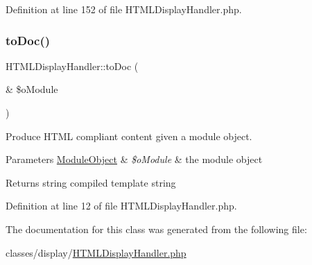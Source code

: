 Definition at line 152 of file H\+T\+M\+L\+Display\+Handler.\+php.

\hypertarget{classHTMLDisplayHandler_a01d7fabb31ab447663f866efa36118a3}{}\label{classHTMLDisplayHandler_a01d7fabb31ab447663f866efa36118a3} 
\subsubsection{\texorpdfstring{to\+Doc()}{toDoc()}}
{\footnotesize\ttfamily H\+T\+M\+L\+Display\+Handler\+::to\+Doc (\begin{DoxyParamCaption}\item[{\&}]{\$o\+Module }\end{DoxyParamCaption})}

Produce H\+T\+ML compliant content given a module object.~\newline

\begin{DoxyParams}[1]{Parameters}
\hyperlink{classModuleObject}{Module\+Object} & {\em \$o\+Module} & the module object \\
\hline
\end{DoxyParams}
\begin{DoxyReturn}{Returns}
string compiled template string 
\end{DoxyReturn}


Definition at line 12 of file H\+T\+M\+L\+Display\+Handler.\+php.



The documentation for this class was generated from the following file\+:\begin{DoxyCompactItemize}
\item 
classes/display/\hyperlink{HTMLDisplayHandler_8php}{H\+T\+M\+L\+Display\+Handler.\+php}\end{DoxyCompactItemize}
